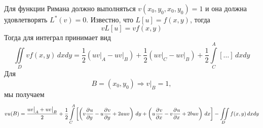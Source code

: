 Для функции Римана должно выполняться $v(x_0, y_0, x_0, y_0) = 1$ и она должна удовлетворять $L^*(v) = 0$. Известно, что $L[u] = f(x, y)$, тогда
\[
	vL[u] = v f(x, y)
\]
Тогда для интеграл принимает вид
\[
	\iint\limits_D v f(x, y)\, dx dy = \frac{1}{2} \left(uv\Big|_A - u v\Big|_B \right) + \frac{1}{2} \left(uv\Big|_C - uv \Big|_B \right) + \frac{1}{2} \int\limits_C^A \left[ \ldots \right]\, dx dy
\]
Для
\[
	B= (x_0, y_0) \Rightarrow v\Big|_B = 1,
\]
мы получаем
\[
	v u(B) = \frac{uv\big|_A + u v \big|_B}{2} + \frac{1}{2} \int\limits_C^A \left[\left(v \frac{\partial^{}u}{\partial y^{}} - u \frac{\partial^{}v}{\partial y^{}}  + 2 auv\right)\, dy + \left(u \frac{\partial^{}v}{\partial x^{}} - v \frac{\partial^{}u}{\partial x^{}} + 2 bu v \right)\, dx \right] - \iint\limits_D f(x,y)\, dx dy
\]
\newpage
